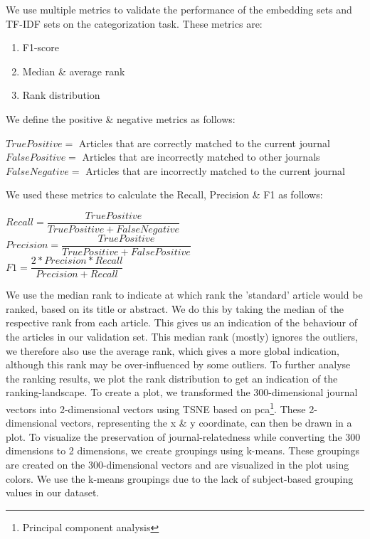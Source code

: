 \documentclass[../../Thesis.tex]{subfiles}
\begin{document}
\clearpage
{}
We use multiple metrics to validate the performance of the embedding sets and TF-IDF sets on the categorization task. These metrics are:
\begin{enumerate}
\item{F1-score}
\item{Median \& average rank}
\item{Rank distribution}
\end{enumerate}
We define the positive \& negative metrics as follows:\\
\begin{jumpin}
$True Positive = $ Articles that are correctly matched to the current journal\\
$False Positive = $ Articles that are incorrectly matched to other journals\\
$False Negative = $ Articles that are incorrectly matched to the current journal\\
\end{jumpin}
We used these metrics to calculate the Recall, Precision \& F1 as follows:\\
\begin{jumpin}
$Recall = \dfrac{True Positive}{True Positive + False Negative}$\vspace{0.1in}\\
$Precision = \dfrac{True Positive}{True Positive + False Positive}$\vspace{0.1in}\\
$F1 = \dfrac{2 * Precision * Recall}{Precision + Recall}$
\end{jumpin}
We use the median rank to indicate at which rank the 'standard' article would be ranked, based on its title or abstract. We do this by taking the median of the respective rank from each article. This gives us an indication of the behaviour of the articles in our validation set. This median rank (mostly) ignores the outliers, we therefore also use the average rank, which gives a more global indication, although this rank may be over-influenced by some outliers.
To further analyse the ranking results, we plot the rank distribution to get an indication of the ranking-landscape.
To create a plot, we transformed the 300-dimensional journal vectors into 2-dimensional vectors using TSNE based on pca\footnote{Principal component analysis}. These 2-dimensional vectors, representing the x \& y coordinate, can then be drawn in a plot. To visualize the preservation of journal-relatedness while converting the 300 dimensions to 2 dimensions, we create groupings using k-means. These groupings are created on the 300-dimensional vectors and are visualized in the plot using colors. We use the k-means groupings due to the lack of subject-based grouping values in our dataset.
\end{document}
